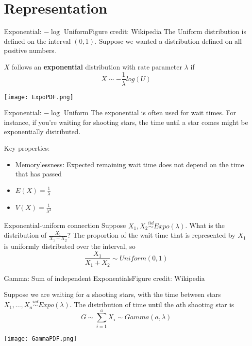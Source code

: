 \documentclass{beamer}
\begin{document}
\section{Representation}
\begin{frame}{Exponential: $-\log$ Uniform}{Figure credit: Wikipedia}
The Uniform distribution is defined on the interval $(0,1)$. Suppose we wanted a distribution defined on all positive numbers.
\begin{definition}
$X$ follows an \textbf{exponential} distribution with rate parameter $\lambda$ if
$$X\sim -\frac{1}{\lambda} log(U)$$
\end{definition}
\begin{center}\texttt{[image: ExpoPDF.png]}\end{center}
\end{frame}

\begin{frame}{Exponential: $-\log$ Uniform}
The exponential is often used for wait times. For instance, if you're waiting for shooting stars, the time until a star comes might be exponentially distributed.

Key properties:
\begin{itemize}
\item Memorylessness: Expected remaining wait time does not depend on the time that has passed
\item $E(X)=\frac{1}{\lambda}$
\item $V(X)=\frac{1}{\lambda^2}$
\end{itemize}
\end{frame}

\begin{frame}{Exponential-uniform connection}
Suppose $X_1,X_2\stackrel{iid}{\sim} Expo(\lambda)$. What is the distribution of $\frac{X_1}{X_1+X_2}$?
\pause
The proportion of the wait time that is represented by $X_1$ is uniformly distributed over the interval, so
$$\frac{X_1}{X_1+X_2}\sim Uniform(0,1)$$
\end{frame}

\begin{frame}{Gamma: Sum of independent Exponentials}{Figure credit: Wikipedia}
\begin{definition}
Suppose we are waiting for $a$ shooting stars, with the time between stars $X_1,\dots,X_a\stackrel{iid}{\sim}Expo(\lambda)$. The distribution of time until the $a$th shooting star is
$$G\sim \sum_{i=1}^a X_i\sim Gamma(a,\lambda)$$
\end{definition}
\begin{center}\texttt{[image: GammaPDF.png]}\end{center}
\end{frame}
\end{document}
